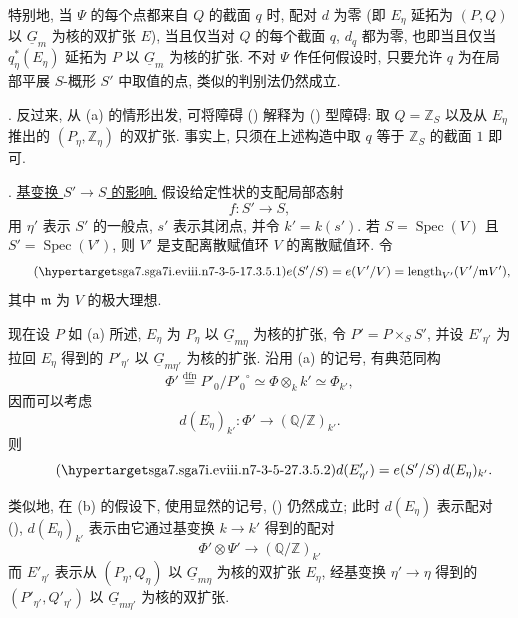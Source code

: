 特别地, 当 $\Psi$ 的每个点都来自 $Q$ 的截面 $q$ 时, 配对 $d$ 为零 (即 $E_\eta$ 延拓为 $(P,Q)$ 以 $\underline G_m$ 为核的双扩张 $E$), 当且仅当对 $Q$ 的每个截面 $q$, $d_q$ 都为零, 也即当且仅当 $q_\eta^*(E_\eta)$ 延拓为 $P$ 以 $\underline G_m$ 为核的扩张. 不对 $\Psi$ 作任何假设时, 只要允许 $q$ 为在局部平展 $S$-概形 $S'$ 中取值的点, 类似的判别法仍然成立.

\smallskip
\noindent {}. 反过来, 从 (a) 的情形出发, 可将障碍 () 解释为 () 型障碍: 取 $Q=\mathbb Z_S$ 以及从 $E_\eta$ 推出的 $(P_\eta,\mathbb Z_\eta)$ 的双扩张. 事实上, 只须在上述构造中取 $q$ 等于 $\mathbb Z_S$ 的截面 $1$ 即可.

\medskip
\noindent {}. \underline{基变换 $S'\to S$ 的影响.} 假设给定性状的支配局部态射
\[
 f:S'\longrightarrow S,
\]
用 $\eta'$ 表示 $S'$ 的一般点, $s'$ 表示其闭点, 并令 $k'=k(s')$. 若 $S=\operatorname{Spec}(V)$ 且 $S'=\operatorname{Spec}(V')$, 则 $V'$ 是支配离散赋值环 $V$ 的离散赋值环. 令
\begin{equation}\tag{\SGARefTarget{sga7.sga7i.eviii.n7-3-5-1}{7.3.5.1}}
 e(S'/S)=e(V'/V)=\operatorname{length}_{V'}(V'/\mathfrak m V'),
\end{equation}
其中 $\mathfrak m$ 为 $V$ 的极大理想.

现在设 $P$ 如 (a) 所述, $E_\eta$ 为 $P_\eta$ 以 $\underline G_{m\eta}$ 为核的扩张, 令 $P'=P\times_S S'$, 并设 $E'_{\eta'}$ 为拉回 $E_\eta$ 得到的 $P'_{\eta'}$ 以 $\underline G_{m\eta'}$ 为核的扩张. 沿用 (a) 的记号, 有典范同构
\[
 \Phi'\overset{\mathrm{dfn}}{=}P'_0/{P'_0}^{\circ}
 \simeq\Phi\otimes_k k'\simeq\Phi_{k'},
\]
因而可以考虑
\[
 d(E_\eta)_{k'}:\Phi'\longrightarrow(\mathbb Q/\mathbb Z)_{k'}.
\]
则
\begin{equation}\tag{\SGARefTarget{sga7.sga7i.eviii.n7-3-5-2}{7.3.5.2}}
 d(E'_{\eta'})=e(S'/S)\,d(E_\eta)_{k'}.
\end{equation}

类似地, 在 (b) 的假设下, 使用显然的记号, () 仍然成立; 此时 $d(E_\eta)$ 表示配对 (), $d(E_\eta)_{k'}$ 表示由它通过基变换 $k\to k'$ 得到的配对
\[
 \Phi'\otimes\Psi'\longrightarrow(\mathbb Q/\mathbb Z)_{k'}
\]
而 $E'_{\eta'}$ 表示从 $(P_\eta,Q_\eta)$ 以 $\underline G_{m\eta}$ 为核的双扩张 $E_\eta$, 经基变换 $\eta'\to\eta$ 得到的 $(P'_{\eta'},Q'_{\eta'})$ 以 $\underline G_{m\eta'}$ 为核的双扩张.

